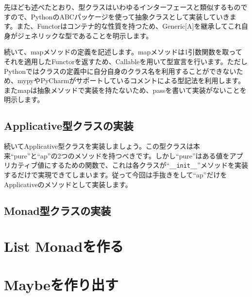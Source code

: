 
先ほども述べたとおり、型クラスはいわゆるインターフェースと類似するものですので、PythonのABCパッケージを使って抽象クラスとして実装していきます。また、Functorはコンテナ的な性質を持つため、Generic[A]を継承してこれ自身がジェネリックな型であることを明示します。

続いて、mapメソッドの定義を記述します。mapメソッドは1引数関数を取ってそれを適用したFunctorを返すため、Callableを用いて型宣言を行います。ただしPythonではクラスの定義中に自分自身のクラス名を利用することができないため、mypyやPyCharmがサポートしているコメントによる型記法を利用します。またmapは抽象メソッドで実装を持たないため、passを書いて実装がないことを明示します。

\subsection{Applicative型クラスの実装}
続いてApplicative型クラスを実装しましょう。この型クラスは本来``pure''と``ap''の2つのメソッドを持つべきです。しかし``pure''はある値をアプリカティブ値にするための関数で、これは各クラスが``\verb+__init__+''メソッドを実装するだけで実現できてしまいます。従って今回は手抜きをして``ap''だけをApplicativeのメソッドとして実装します。

\subsection{Monad型クラスの実装}

\section{List Monadを作る}


\section{Maybeを作り出す}
